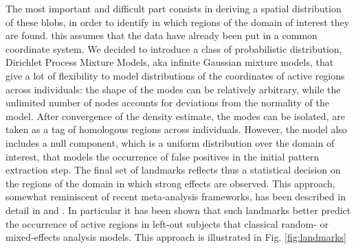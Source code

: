 \documentclass{bioinfo}
\begin{document}
The most important and difficult part consists in deriving a spatial
distribution of these blobs, in order to identify in which regions of
the domain of interest they are found.
%
this assumes that the data have already been put in a common coordinate
system.
%
We decided to introduce a class of probabilistic distribution,
Dirichlet Process Mixture Models, aka infinite Gaussian mixture
models, that give a lot of flexibility to model distributions of the
coordinates of active regions across individuals: the shape of the
modes can be relatively arbitrary, while the unlimited number of nodes
accounts for deviations from the normality of the model.
%
After convergence of the density estimate, the modes can be isolated,
are taken as a tag of homologous regions across individuals.
%
However, the model also includes a null component, which is a uniform
distribution over the domain of interest, that models the occurrence of
false positives in the initial pattern extraction step.
%
The final set of landmarks reflects thus a statistical decision on
the regions of the domain in which strong effects are observed.
%
This approach, somewhat reminiscent of recent meta-analysis frameworks,
has been described in detail in \cite{Thirion2007} and
\cite{Thirion2010}.
%
In particular it has been shown that such landmarks better predict
the occurrence of active regions in left-out subjects that classical
random- or mixed-effects analysis models.
%
This approach is illustrated in Fig. \ref{fig:landmarks} 
\end{document}
